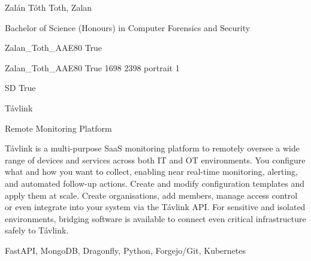 \documentclass[twoside]{report}
\begin{document}
\begingroup{}\relax



\def\Key{Zalan_Toth_AAE80}

{Zalán Tóth}
{Toth, Zalan}

{Bachelor of Science (Honours) in Computer Forensics and Security}

{Zalan_Toth_AAE80}
{True}

{Zalan_Toth_AAE80}
{True}
{1698}
{2398}
{portrait}
{1}

{SD}
{True}

{Távlink}

{Remote Monitoring Platform}

{Távlink is a multi-purpose SaaS monitoring platform to remotely oversee a wide range of devices and services across both IT and OT environments. You configure what and how you want to collect, enabling near real-time monitoring, alerting, and automated follow-up actions. Create and modify configuration templates and apply them at scale. Create organisations, add members, manage access control or even integrate into your system via the Távlink API. For sensitive and isolated environments, bridging software is available to connect even critical infrastructure safely to Távlink.}

{FastAPI, MongoDB, Dragonfly, Python, Forgejo/Git, Kubernetes}
\end{document}
